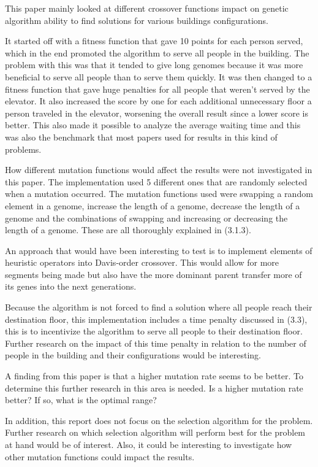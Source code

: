 
This paper mainly looked at different crossover functions impact on genetic algorithm ability to find solutions for various buildings configurations.

It started off with a fitness function that gave 10 points for each person served, which in the end promoted the algorithm to serve all people in the building.
The problem with this was that it tended to give long genomes because it was more beneficial to serve all people than to serve them quickly.
It was then changed to a fitness function that gave huge penalties for all people that weren't served by the elevator. It also increased the score by one for each additional unnecessary floor a person traveled in the elevator, worsening the overall result since a lower score is better.
This also made it possible to analyze the average waiting time and this was also the benchmark that most papers used for results in this kind of problems.

How different mutation functions would affect the results were not investigated in this paper. The implementation used 5 different ones that are randomly selected when a mutation occurred.
The mutation functions used were swapping a random element in a genome, increase the length of a genome, decrease the length of a genome and the combinations of swapping and increasing or decreasing the length of a genome.
These are all thoroughly explained in (3.1.3).

An approach that would have been interesting to test is to implement elements of heuristic operators into Davis-order crossover.
This would allow for more segments being made but also have the more dominant parent transfer more of its genes into the next generations.

Because the algorithm is not forced to find a solution where all people reach their destination floor, this implementation includes a time penalty discussed in (3.3), this is to incentivize the algorithm to serve all people to their destination floor.
Further research on the impact of this time penalty in relation to the number of people in the building and their configurations would be interesting.

A finding from this paper is that a higher mutation rate seems to be better. To determine this further research in this area is needed. Is a higher mutation rate better? If so, what is the optimal range?

In addition, this report does not focus on the selection algorithm for the problem. Further research on which selection algorithm will perform best for the problem at hand would be of interest.
Also, it could be interesting to investigate how other mutation functions could impact the results.